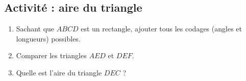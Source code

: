 
\subsection*{Activité : aire du triangle}


\begin{center}
   
\end{center}
\begin{enumerate}
    \item
        Sachant que \( ABCD\) est un rectangle, ajouter tous les codages (angles et longueurs) possibles.
    \item
        Comparer les triangles \( AED\) et \( DEF\).
    \item
        Quelle est l'aire du triangle \( DEC\) ?
\end{enumerate}
